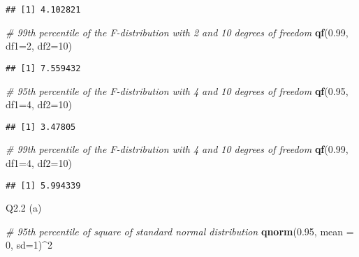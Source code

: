 \documentclass[
]{article}
\newenvironment{Shaded}{\begin{snugshade}}{\end{snugshade}}
\newcommand{\AttributeTok}[1]{\textcolor[rgb]{0.13,0.29,0.53}{#1}}
\newcommand{\CommentTok}[1]{\textcolor[rgb]{0.56,0.35,0.01}{\textit{#1}}}
\newcommand{\DecValTok}[1]{\textcolor[rgb]{0.00,0.00,0.81}{#1}}
\newcommand{\FloatTok}[1]{\textcolor[rgb]{0.00,0.00,0.81}{#1}}
\newcommand{\FunctionTok}[1]{\textcolor[rgb]{0.13,0.29,0.53}{\textbf{#1}}}
\newcommand{\NormalTok}[1]{#1}
\newcommand{\SpecialCharTok}[1]{\textcolor[rgb]{0.81,0.36,0.00}{\textbf{#1}}}
\begin{document}
\begin{verbatim}
## [1] 4.102821
\end{verbatim}

\begin{Shaded}
\begin{Highlighting}[]
\CommentTok{\# 99th percentile of the F{-}distribution with 2 and 10 degrees of freedom}
\FunctionTok{qf}\NormalTok{(}\FloatTok{0.99}\NormalTok{, }\AttributeTok{df1=}\DecValTok{2}\NormalTok{, }\AttributeTok{df2=}\DecValTok{10}\NormalTok{)}
\end{Highlighting}
\end{Shaded}

\begin{verbatim}
## [1] 7.559432
\end{verbatim}

\begin{Shaded}
\begin{Highlighting}[]
\CommentTok{\# 95th percentile of the F{-}distribution with 4 and 10 degrees of freedom}
\FunctionTok{qf}\NormalTok{(}\FloatTok{0.95}\NormalTok{, }\AttributeTok{df1=}\DecValTok{4}\NormalTok{, }\AttributeTok{df2=}\DecValTok{10}\NormalTok{)}
\end{Highlighting}
\end{Shaded}

\begin{verbatim}
## [1] 3.47805
\end{verbatim}

\begin{Shaded}
\begin{Highlighting}[]
\CommentTok{\# 99th percentile of the F{-}distribution with 4 and 10 degrees of freedom}
\FunctionTok{qf}\NormalTok{(}\FloatTok{0.99}\NormalTok{, }\AttributeTok{df1=}\DecValTok{4}\NormalTok{, }\AttributeTok{df2=}\DecValTok{10}\NormalTok{)}
\end{Highlighting}
\end{Shaded}

\begin{verbatim}
## [1] 5.994339
\end{verbatim}

Q2.2 (a)

\begin{Shaded}
\begin{Highlighting}[]
\CommentTok{\# 95th percentile of square of standard normal distribution}
\FunctionTok{qnorm}\NormalTok{(}\FloatTok{0.95}\NormalTok{, }\AttributeTok{mean =} \DecValTok{0}\NormalTok{, }\AttributeTok{sd=}\DecValTok{1}\NormalTok{)}\SpecialCharTok{\^{}}\DecValTok{2}
\end{Highlighting}
\end{Shaded}
\end{document}
